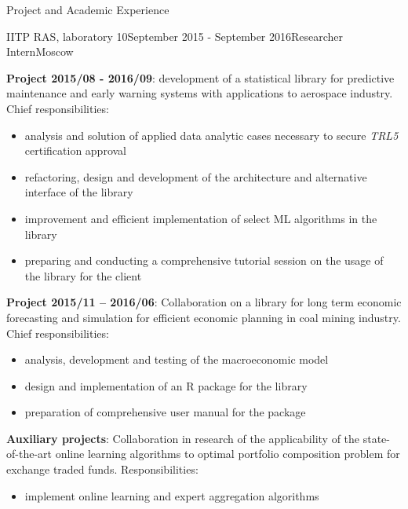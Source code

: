 \documentclass{resume} %
\begin{document}
\begin{rSection}{Project and Academic Experience}
\bigskip
\begin{rSubsection}{IITP RAS, laboratory 10}{September 2015 - September 2016}{Researcher Intern}{Moscow}
    \item \textbf{Project 2015/08 - 2016/09}: development of a statistical library
    for predictive maintenance and early warning systems with applications to
    aerospace industry.
    Chief responsibilities: \begin{itemize}
        \item analysis and solution of applied data analytic cases necessary to
        secure \textit{TRL5} certification approval

        \item refactoring, design and development of the architecture and alternative
        interface of the library

        \item improvement and efficient implementation of select ML algorithms in
        the library

        \item preparing and conducting a comprehensive tutorial session on the usage
        of the library for the client
    \end{itemize}

    \medskip
    \item \textbf{Project 2015/11 -- 2016/06}: Collaboration on a library for long
    term economic forecasting and simulation for efficient economic planning in coal
    mining industry.
    Chief responsibilities: \begin{itemize}
        \item analysis, development and testing of the macroeconomic model

        \item design and implementation of an R package for the library

        \item preparation of comprehensive user manual for the package
    \end{itemize}

    \medskip
    \item \textbf{Auxiliary projects}: Collaboration in research of the applicability
    of the state-of-the-art online learning algorithms to optimal portfolio composition
    problem for exchange traded funds. Responsibilities: \begin{itemize}
        \item implement online learning and expert aggregation algorithms


\end{itemize}
\end{rSubsection}
\end{rSection}
\end{document}

